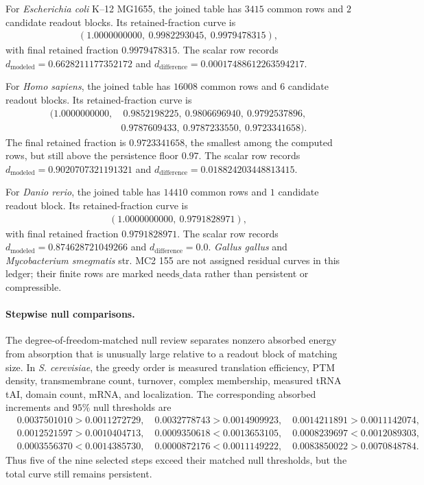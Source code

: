 For \emph{Escherichia coli} K--12 MG1655, the joined table has $3415$ common rows and $2$ candidate readout blocks.  Its retained-fraction curve is
$$
\begin{aligned}
(1.0000000000,\ 0.9982293045,\ 0.9979478315),
\end{aligned}
$$
with final retained fraction $0.9979478315$.  The scalar row records $d_{\mathrm{modeled}}=0.6628211177352172$ and $d_{\mathrm{difference}}=0.00017488612263594217$.

For \emph{Homo sapiens}, the joined table has $16008$ common rows and $6$ candidate readout blocks.  Its retained-fraction curve is
$$
\begin{aligned}
(1.0000000000,&\ 0.9852198225,\ 0.9806696940,\ 0.9792537896,\\
&0.9787609433,\ 0.9787233550,\ 0.9723341658).
\end{aligned}
$$
The final retained fraction is $0.9723341658$, the smallest among the computed rows, but still above the persistence floor $0.97$.  The scalar row records $d_{\mathrm{modeled}}=0.9020707321191321$ and $d_{\mathrm{difference}}=0.018824203448813415$.

For \emph{Danio rerio}, the joined table has $14410$ common rows and $1$ candidate readout block.  Its retained-fraction curve is
$$
\begin{aligned}
(1.0000000000,\ 0.9791828971),
\end{aligned}
$$
with final retained fraction $0.9791828971$.  The scalar row records $d_{\mathrm{modeled}}=0.874628721049266$ and $d_{\mathrm{difference}}=0.0$.  \emph{Gallus gallus} and \emph{Mycobacterium smegmatis} str. MC2 155 are not assigned residual curves in this ledger; their finite rows are marked $\mathrm{needs\_data}$ rather than persistent or compressible.

\paragraph{Stepwise null comparisons.}
The degree-of-freedom-matched null review separates nonzero absorbed energy from absorption that is unusually large relative to a readout block of matching size.  In \emph{S. cerevisiae}, the greedy order is measured translation efficiency, PTM density, transmembrane count, turnover, complex membership, measured tRNA tAI, domain count, mRNA, and localization.  The corresponding absorbed increments and $95\%$ null thresholds are
$$
\begin{aligned}
&0.0037501010>0.0011272729,\quad
0.0032778743>0.0014909923,\quad
0.0014211891>0.0011142074,\\
&0.0012521597>0.0010404713,\quad
0.0009350618<0.0013653105,\quad
0.0008239697<0.0012089303,\\
&0.0003556370<0.0014385730,\quad
0.0000872176<0.0011149222,\quad
0.0083850022>0.0070848784.
\end{aligned}
$$
Thus five of the nine selected steps exceed their matched null thresholds, but the total curve still remains persistent.

